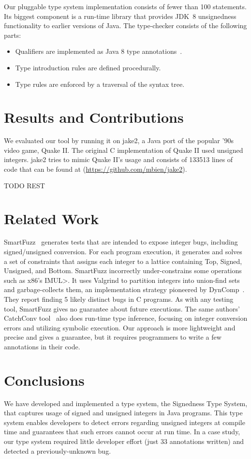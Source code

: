 Our pluggable type system implementation consists of fewer than 100
statements.  Its biggest component is a run-time library that provides
JDK~8 unsignedness functionality to earlier versions of Java.  The
type-checker consists of the following parts:

\begin{itemize}\itemsep 0pt \parskip 0pt
  \item Qualifiers are implemented as Java 8 type
    annotations~\cite{JSR308-PFD}.
  \item Type introduction rules are defined procedurally.
  \item Type rules are enforced by a traversal of the syntax tree.
\end{itemize}


\section{Results and Contributions}

We evaluated our tool by running it on jake2, a Java
port of the popular '90s video game, Quake II\@.  The original C
implementation of Quake II used unsigned integers. jake2
tries to mimic Quake II's usage and consists of 133513 lines of code that
can be found at (\url{https://github.com/mbien/jake2}).

TODO REST

\section{Related Work}

SmartFuzz~\cite{MolnarLW2009} generates tests that are intended to expose
integer bugs, including signed/unsigned conversion.  For each program
execution, it generates and solves a set of constraints that assigns each
integer to a lattice containing Top, Signed, Unsigned, and Bottom.
SmartFuzz incorrectly under-constrains some operations such as x86's
\<IMUL>.  It uses Valgrind to partition integers into union-find sets and
garbage-collects them, an implementation strategy pioneered by
DynComp~\cite{GuoPME2006}.  They report finding 5 likely distinct bugs in C
programs.  As with any testing tool, SmartFuzz gives no guarantee about
future executions.  The same authors' CatchConv tool~\cite{MolnarW2007}
also does run-time type inference, focusing on integer conversion errors
and utilizing symbolic execution.  Our approach is more lightweight and
precise and gives a guarantee, but it requires programmers to write a few
annotations in their code.


\section{Conclusions}

We have developed and implemented a type system, the Signedness Type System, that
captures usage of signed and unsigned
integers in Java programs.
This type system enables developers to detect errors regarding unsigned
integers at compile time and guarantees that such errors cannot occur at
run time.
In a case study, our type system required little developer effort (just 33
annotations written) and detected a
previously-unknown bug.